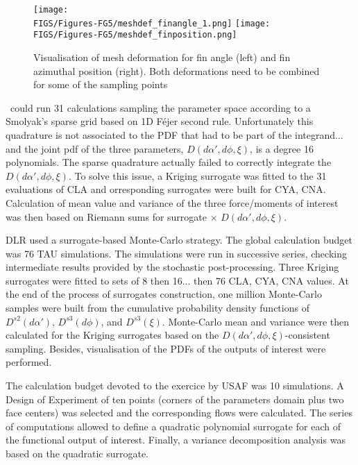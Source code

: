 \documentclass{eurosae}
\begin{document}
\begin{figure}[!h]
\begin{center}
\texttt{[image: \\FIGS/Figures-FG5/meshdef\_finangle\_1.png]}
\hspace{3mm}
\texttt{[image: \\FIGS/Figures-FG5/meshdef\_finposition.png]}
\caption{Visualisation of mesh deformation for fin angle (left) and fin azimuthal position (right). Both deformations need to be combined
 for some of the sampling points}
\end{center}
\end{figure}

\Onera\ could run 31 calculations sampling the parameter space according to a Smolyak's sparse grid based on 1D F\'ejer second rule. Unfortunately this quadrature is not associated to the PDF that had to be part of the integrand... and the joint pdf of the three parameters, $D(d\alpha',d\phi,\xi)$, is a degree 16 polynomials. The sparse quadrature actually failed to correctly integrate the $D(d\alpha',d\phi,\xi)$. To solve this issue, a Kriging surrogate was fitted to the 31 evaluations of CLA and orresponding surrogates were built for CYA, CNA. Calculation of mean value and variance of the three force/moments of interest was then based on Riemann sums for surrogate $\times $  $D(d\alpha',d\phi,\xi)$.
 
DLR used a surrogate-based Monte-Carlo strategy. The global calculation budget was 76 TAU simulations. The simulations were run in successive series, checking intermediate results provided by the stochastic post-processing. Three Kriging surrogates were fitted to sets of 8 then 16... then 76 CLA, CYA, CNA values. At the end of the process of surrogates construction, one million Monte-Carlo samples were built from the cumulative probability density functions of $D^{s2}(d\alpha')$, $D^{s3}(d\phi)$, and $D^{s3}(\xi)$. Monte-Carlo mean and variance were then calculated for the Kriging surrogates based on the  $D(d\alpha',d\phi,\xi)$-consistent sampling. Besides, visualisation of the PDFs of the outputs of interest were performed.

The calculation budget devoted to the exercice by USAF was 10 simulations. A Design of Experiment of ten points (corners of the parameters domain plus two face centers) was selected and the corresponding flows were calculated. The series of computations allowed to define a quadratic polynomial surrogate for each of the functional output of interest. Finally, a variance decomposition analysis was based on the quadratic surrogate.
\end{document}
